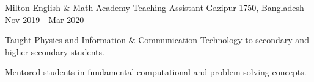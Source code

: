 
\begin{cventries}

  \cventry
    {Milton English \& Math Academy} %
    {Teaching Assistant} %
    {Gazipur 1750, Bangladesh} %
    {Nov 2019 - Mar 2020} %
    {
      \begin{cvitems} %
        \item {Taught Physics and Information \& Communication Technology to secondary and higher-secondary students.}
        \item{Mentored students in fundamental computational and problem-solving concepts.}
      \end{cvitems}
    }

\end{cventries}
